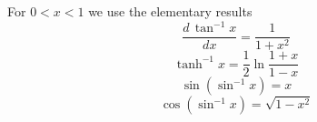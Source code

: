 \documentclass{article}
\begin{document}
For $0 < x < 1$ we use the elementary results
\begin{equation}
\frac{d\,\tan^{-1} x}{dx} = \frac{1}{1+x^2}
\label{eq:a1}
\end{equation}
\begin{equation}
\tanh^{-1} x = \frac{1}{2}\ln\frac{1+x}{1-x}
\label{eq:a2}
\end{equation}
\begin{equation}
\sin\left(\sin^{-1} x\right) = x
\label{eq:a3}
\end{equation}
\begin{equation}
\cos\left(\sin^{-1} x\right) = \sqrt{1-x^2}
\label{eq:a4}
\end{equation}
\end{document}

